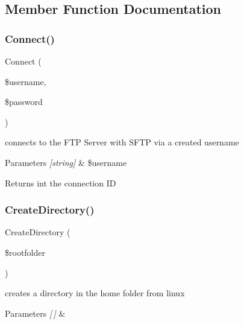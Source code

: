 \subsection{Member Function Documentation}
\mbox{\label{class_f_t_p_handler_a668e910f36a3b4f42c18576ac11a3cca}} 
\subsubsection{\texorpdfstring{Connect()}{Connect()}}
{\footnotesize\ttfamily Connect (\begin{DoxyParamCaption}\item[{}]{\$username,  }\item[{}]{\$password }\end{DoxyParamCaption})}



connects to the F\+TP Server with S\+F\+TP via a created username 


\begin{DoxyParams}{Parameters}
{\em \mbox{[}string\mbox{]}} & \$username\\
\hline
\end{DoxyParams}
\begin{DoxyReturn}{Returns}
int the connection ID 
\end{DoxyReturn}
\mbox{\label{class_f_t_p_handler_a3a8dfc5c7a497057832a9baf8fef8fee}} 
\subsubsection{\texorpdfstring{Create\+Directory()}{CreateDirectory()}}
{\footnotesize\ttfamily Create\+Directory (\begin{DoxyParamCaption}\item[{}]{\$rootfolder }\end{DoxyParamCaption})}



creates a directory in the home folder from linux 


\begin{DoxyParams}{Parameters}
{\em \mbox{[}$\,$\mbox{]}} & \\
\hline
\end{DoxyParams}
\mbox{\label{class_f_t_p_handler_ade28de62e449ec73546c4093fa4d6708}} 
